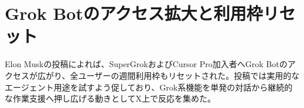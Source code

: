 \section{Grok Botのアクセス拡大と利用枠リセット}
Elon Muskの投稿によれば、SuperGrokおよびCursor Pro加入者へGrok Botのアクセスが広がり、全ユーザーの週間利用枠もリセットされた。投稿では実用的なエージェント用途を試すよう促しており、Grok系機能を単発の対話から継続的な作業支援へ押し広げる動きとしてX上で反応を集めた。
